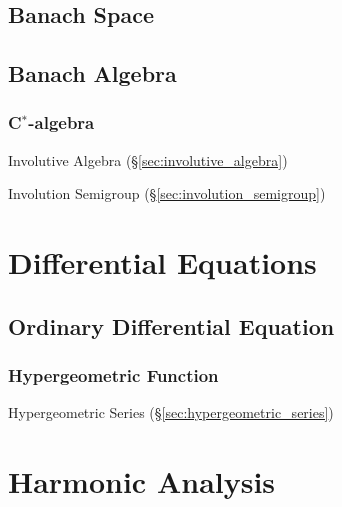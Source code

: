 \subsection{Banach Space}\label{sec:banach_space}

\subsection{Banach Algebra}\label{sec:banach_algebra}

\subsubsection{C$^*$-algebra}\label{sec:cstar_algebra}

Involutive Algebra (\S\ref{sec:involutive_algebra})

Involution Semigroup (\S\ref{sec:involution_semigroup})



\section{Differential Equations}\label{sec:differential_equations}

\subsection{Ordinary Differential Equation}
\label{sec:ode}

\subsubsection{Hypergeometric Function}
\label{sec:hypergeometric_function}

Hypergeometric Series (\S\ref{sec:hypergeometric_series})



\section{Harmonic Analysis}\label{sec:harmonic_analysis}

